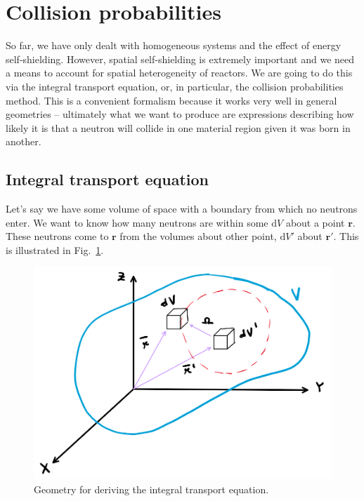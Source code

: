 \section{Collision probabilities}

So far, we have only dealt with homogeneous systems and the effect of energy self-shielding. However, spatial self-shielding is extremely important and we need a means to account for spatial heterogeneity of reactors. We are going to do this via the integral transport equation, or, in particular, the collision probabilities method. This is a convenient formalism because it works very well in general geometries -- ultimately what we want to produce are expressions describing how likely it is that a neutron will collide in one material region given it was born in another.

\subsection{Integral transport equation}

Let's say we have some volume of space with a boundary from which no neutrons enter. We want to know how many neutrons are within some $\mathrm{d}V$ about a point $\mathbf{r}$. These neutrons come to $\mathbf{r}$ from the volumes about other point, $\mathrm{d}V'$ about $\mathbf{r}'$. This is illustrated in Fig.~\ref{fig:CP}.

\begin{figure}[h]
  \centering
  \includegraphics[scale=0.70]{./Figures/P5/integralTransport.png} 
  \caption{Geometry for deriving the integral transport equation.} 
  \label{fig:CP}
\end{figure}

